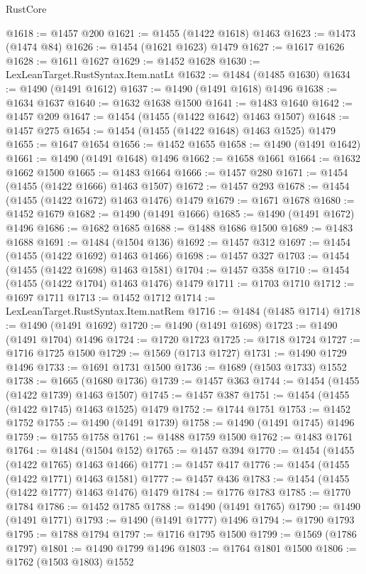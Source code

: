 \begin{lexlean}{RustCore}
\begin{coremodule}
@1618 := @1457 @200
@1621 := @1455 (@1422 @1618) @1463
@1623 := @1473 (@1474 @84)
@1626 := @1454 (@1621 @1623) @1479
@1627 := @1617 @1626
@1628 := @1611 @1627
@1629 := @1452 @1628
@1630 := LexLeanTarget.RustSyntax.Item.natLt
@1632 := @1484 (@1485 @1630)
@1634 := @1490 (@1491 @1612)
@1637 := @1490 (@1491 @1618) @1496
@1638 := @1634 @1637
@1640 := @1632 @1638 @1500
@1641 := @1483 @1640
@1642 := @1457 @209
@1647 := @1454 (@1455 (@1422 @1642) @1463 @1507)
@1648 := @1457 @275
@1654 := @1454 (@1455 (@1422 @1648) @1463 @1525) @1479
@1655 := @1647 @1654
@1656 := @1452 @1655
@1658 := @1490 (@1491 @1642)
@1661 := @1490 (@1491 @1648) @1496
@1662 := @1658 @1661
@1664 := @1632 @1662 @1500
@1665 := @1483 @1664
@1666 := @1457 @280
@1671 := @1454 (@1455 (@1422 @1666) @1463 @1507)
@1672 := @1457 @293
@1678 := @1454 (@1455 (@1422 @1672) @1463 @1476) @1479
@1679 := @1671 @1678
@1680 := @1452 @1679
@1682 := @1490 (@1491 @1666)
@1685 := @1490 (@1491 @1672) @1496
@1686 := @1682 @1685
@1688 := @1488 @1686 @1500
@1689 := @1483 @1688
@1691 := @1484 (@1504 @136)
@1692 := @1457 @312
@1697 := @1454 (@1455 (@1422 @1692) @1463 @1466)
@1698 := @1457 @327
@1703 := @1454 (@1455 (@1422 @1698) @1463 @1581)
@1704 := @1457 @358
@1710 := @1454 (@1455 (@1422 @1704) @1463 @1476) @1479
@1711 := @1703 @1710
@1712 := @1697 @1711
@1713 := @1452 @1712
@1714 := LexLeanTarget.RustSyntax.Item.natRem
@1716 := @1484 (@1485 @1714)
@1718 := @1490 (@1491 @1692)
@1720 := @1490 (@1491 @1698)
@1723 := @1490 (@1491 @1704) @1496
@1724 := @1720 @1723
@1725 := @1718 @1724
@1727 := @1716 @1725 @1500
@1729 := @1569 (@1713 @1727)
@1731 := @1490 @1729 @1496
@1733 := @1691 @1731 @1500
@1736 := @1689 (@1503 @1733) @1552
@1738 := @1665 (@1680 @1736)
@1739 := @1457 @363
@1744 := @1454 (@1455 (@1422 @1739) @1463 @1507)
@1745 := @1457 @387
@1751 := @1454 (@1455 (@1422 @1745) @1463 @1525) @1479
@1752 := @1744 @1751
@1753 := @1452 @1752
@1755 := @1490 (@1491 @1739)
@1758 := @1490 (@1491 @1745) @1496
@1759 := @1755 @1758
@1761 := @1488 @1759 @1500
@1762 := @1483 @1761
@1764 := @1484 (@1504 @152)
@1765 := @1457 @394
@1770 := @1454 (@1455 (@1422 @1765) @1463 @1466)
@1771 := @1457 @417
@1776 := @1454 (@1455 (@1422 @1771) @1463 @1581)
@1777 := @1457 @436
@1783 := @1454 (@1455 (@1422 @1777) @1463 @1476) @1479
@1784 := @1776 @1783
@1785 := @1770 @1784
@1786 := @1452 @1785
@1788 := @1490 (@1491 @1765)
@1790 := @1490 (@1491 @1771)
@1793 := @1490 (@1491 @1777) @1496
@1794 := @1790 @1793
@1795 := @1788 @1794
@1797 := @1716 @1795 @1500
@1799 := @1569 (@1786 @1797)
@1801 := @1490 @1799 @1496
@1803 := @1764 @1801 @1500
@1806 := @1762 (@1503 @1803) @1552

\end{coremodule}
\end{lexlean}
